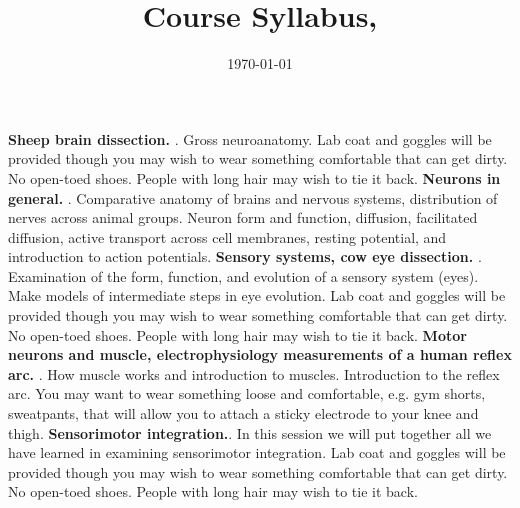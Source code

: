 \documentclass{exam}
\title{Course Syllabus, \mobeardCourseTerm}
\author{\mobeardInstructorShort}
\date{\today}
\begin{document}
\maketitle

\begin{questions}
\question \textbf{Sheep brain dissection.} . Gross neuroanatomy. Lab coat and goggles will be provided though you may wish to wear something comfortable that can get dirty. No open-toed shoes. People with long hair may wish to tie it back. 
\question \textbf{Neurons in general.} .  Comparative anatomy of brains and nervous systems, distribution of nerves across animal groups. Neuron form and function, diffusion, facilitated diffusion, active transport across cell membranes, resting potential, and introduction to action potentials.
\question \textbf{Sensory systems, cow eye dissection.} . Examination of the form, function, and evolution of a sensory system (eyes). Make models of intermediate steps in eye evolution. Lab coat and goggles will be provided though you may wish to wear something comfortable that can get dirty. No open-toed shoes. People with long hair may wish to tie it back. 
\question \textbf{Motor neurons and muscle, electrophysiology measurements of a human reflex arc.} . How muscle works and introduction to muscles. Introduction to the reflex arc. You may want to wear something loose and comfortable, e.g. gym shorts, sweatpants, that will allow you to attach a sticky electrode to your knee and thigh. 
\question \textbf{Sensorimotor integration.}. In this session we will put together all we have learned in examining sensorimotor integration. Lab coat and goggles will be provided though you may wish to wear something comfortable that can get dirty. No open-toed shoes. People with long hair may wish to tie it back. 
\end{questions}
\end{document}
